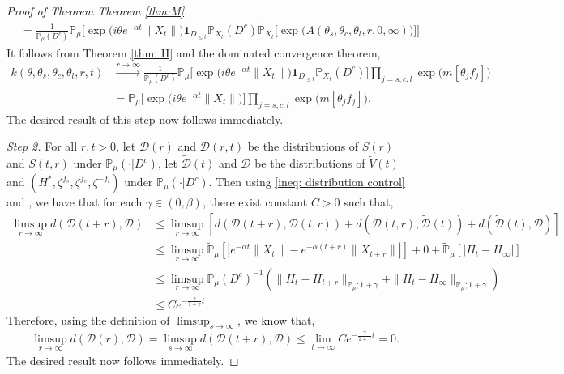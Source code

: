\documentclass[12pt,a4paper]{amsart}
\theoremstyle{plain}
\theoremstyle{definition}
\numberwithin{equation}{section}
\begin{document}
\begin{proof}[Proof of Theorem Theorem \ref{thm:M}]
\begin{align}
&=\frac{1}{\mathbb P_{\mu}(D^c)}\mathbb P_{\mu}\Big[\exp\Big( i\theta e^{-\alpha t}\|X_t\|\Big)\mathbf 1_{D_{\leq t}}\mathbb P_{X_t}(D^c)\widetilde{\mathbb P}_{X_t}\Big[\exp\Big(A(\theta_s,\theta_c,\theta_l,r,0,\infty)\Big)\Big]\Big]
\end{align}
It follows from Theorem \ref{thm: II} and the dominated convergence theorem,
\begin{align}
   k(\theta,\theta_s, \theta_c,\theta_l,r,t)& \xrightarrow{r\to \infty}\frac{1}{\mathbb P_{\mu}(D^c)}\mathbb P_{\mu}\Big[\exp\Big(i\theta e^{-\alpha t}\|X_t\|\Big)\mathbf 1_{D_{\leq t}}\mathbb P_{X_t}(D^c)\Big]
   \prod_{j=s,c,l}\exp\Big(m[\theta_j f_j]\Big)\\
&=\widetilde{\mathbb P}_{\mu}\Big[\exp\Big(i\theta e^{-\alpha t}\|X_t\|\Big)\Big]
\prod_{j=s,c,l}\exp\Big(m[\theta_j f_j]\Big).
\end{align}
The desired result of this step now follows immediately.

\emph{Step 2.} For all $r,t>0$, let $\mathcal D(r)$ and $\mathcal D(r,t)$ be the distributions of $S(r)$ and $S(t,r)$ under $\mathbb P_{\mu}(\cdot|D^c)$, let $ \widetilde{\mathcal D}(t)$ and $\mathcal D$ be the distributions of $\widetilde{V}(t)$ and $(H^*,\zeta^{f_s},\zeta^{f_c},\zeta^{-f_l})$ under $\mathbb P_{\mu}(\cdot|D^c)$. Then using \eqref{ineq: distribution control} and \cite[Lemma 3.3]{RenSongSunZhao2019Stable}, we have that for each $\gamma\in (0,\beta)$, there exist constant $C>0$ such that,
\begin{align}
 \limsup_{r\rightarrow \infty}d(\mathcal D(t+r),\mathcal D)&\leq \limsup_{r\rightarrow \infty}[d(\mathcal D(t+r),\mathcal D(t,r))+d(\mathcal D(t,r),\widetilde{\mathcal D}(t))+d(\widetilde{\mathcal D}(t),\mathcal D)]\\
&\leq \limsup_{r\rightarrow \infty}\widetilde{\mathbb P}_{\mu}[|e^{-\alpha t}\|X_t\|-e^{-\alpha (t+r)}\|X_{t+r}\||]+0+\widetilde{\mathbb P}_{\mu}[|H_t-H_{\infty}|]\\
&\leq \limsup_{r\rightarrow \infty}\mathbb P_{\mu}(D^c)^{-1}(\|H_t-H_{t+r}\|_{\mathbb P_{\mu};1+\gamma}+\|H_t-H_{\infty}\|_{\mathbb P_{\mu};1+\gamma})\\
&\leq Ce^{-\frac{\gamma}{1+\gamma}t}.
\end{align}
Therefore, using the definition of $\limsup_{s\rightarrow \infty}$, we know that,
\begin{align}
 &\limsup_{r\rightarrow \infty}d(\mathcal D(r),\mathcal D) =  \limsup_{s\rightarrow \infty}d(\mathcal D(t+r),\mathcal D)
\leq \lim_{t\rightarrow \infty}Ce^{-\frac{\gamma}{1+\gamma}t} = 0.
\end{align}
The desired result now follows immediately.
\end{proof}
\end{document}
